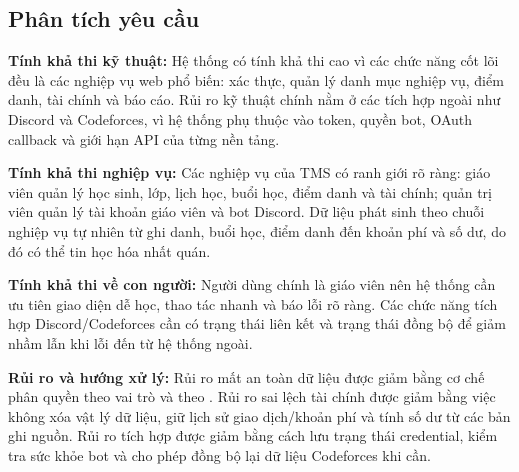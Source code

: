 \documentclass[12pt,a4paper]{article}
\newcommand{\code}[1]{{\ttfamily\seqsplit{#1}}}
\begin{document}
\subsection{Phân tích yêu cầu}

\textbf{Tính khả thi kỹ thuật:} Hệ thống có tính khả thi cao vì các chức năng
cốt lõi đều là các nghiệp vụ web phổ biến: xác thực, quản lý danh mục nghiệp
vụ, điểm danh, tài chính và báo cáo. Rủi ro kỹ thuật chính nằm ở các tích hợp
ngoài như Discord và Codeforces, vì hệ thống phụ thuộc vào token, quyền bot,
OAuth callback và giới hạn API của từng nền tảng.

\textbf{Tính khả thi nghiệp vụ:} Các nghiệp vụ của TMS có ranh giới rõ ràng:
giáo viên quản lý học sinh, lớp, lịch học, buổi học, điểm danh và tài chính;
quản trị viên quản lý tài khoản giáo viên và bot Discord. Dữ liệu phát sinh
theo chuỗi nghiệp vụ tự nhiên từ ghi danh, buổi học, điểm danh đến khoản phí và
số dư, do đó có thể tin học hóa nhất quán.

\textbf{Tính khả thi về con người:} Người dùng chính là giáo viên nên hệ thống
cần ưu tiên giao diện dễ học, thao tác nhanh và báo lỗi rõ ràng. Các chức năng
tích hợp Discord/Codeforces cần có trạng thái liên kết và trạng thái đồng bộ để
giảm nhầm lẫn khi lỗi đến từ hệ thống ngoài.

\textbf{Rủi ro và hướng xử lý:} Rủi ro mất an toàn dữ liệu được giảm bằng cơ chế
phân quyền theo vai trò và theo \code{teacher\_id}. Rủi ro sai lệch tài chính
được giảm bằng việc không xóa vật lý dữ liệu, giữ lịch sử giao dịch/khoản phí
và tính số dư từ các bản ghi nguồn. Rủi ro tích hợp được giảm bằng cách lưu
trạng thái credential, kiểm tra sức khỏe bot và cho phép đồng bộ lại dữ liệu
Codeforces khi cần.
\end{document}
